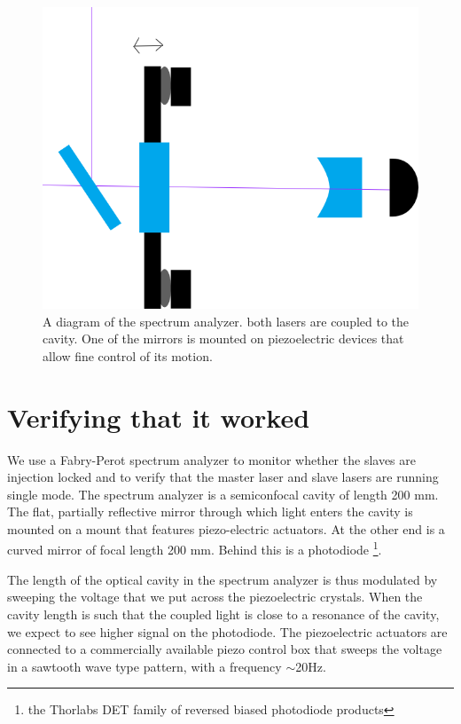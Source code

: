 \begin{figure}
    \centerline{\includegraphics[totalheight=0.3\textheight ]{spectrumAnalyzer}}
    \caption[]{\label{fig:spectrumAnalyzer}
    A diagram of the spectrum analyzer. both lasers are coupled to the cavity. One of the mirrors is mounted on piezoelectric devices that allow fine control of its motion. 
}
\end{figure} 

\section{Verifying that it worked}
We use a Fabry-Perot spectrum analyzer to monitor whether the slaves are injection locked and to verify that the master laser and slave lasers are running single mode. 
The spectrum analyzer is a semiconfocal cavity of length 200 mm. The flat, partially reflective mirror through which light enters the cavity is mounted on a mount that features piezo-electric actuators. At the other end is a curved mirror of focal length 200 mm. Behind this is a photodiode \footnote{the Thorlabs DET family of reversed biased photodiode products}.

The length of the optical cavity in the spectrum analyzer is thus modulated by sweeping the voltage that we put across the piezoelectric crystals. When the cavity length is such that the coupled light is close to a resonance of the cavity, we expect to see higher signal on the photodiode. 
The piezoelectric actuators are connected to a commercially available piezo control box that sweeps the voltage in a sawtooth wave type pattern, with a frequency $\sim$20Hz. 


